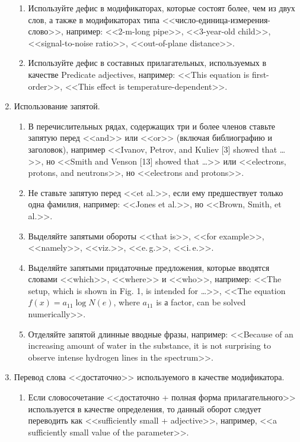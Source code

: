 \documentclass[a5paper, 10pt, twoside, numbers=enddot]{scrartcl}
\begin{document}
\begin{enumerate}
\begin{enumerate}
      \item Используйте дефис в модификаторах, которые состоят более, чем из двух слов, а также в
        модификаторах типа <<число-единица-измерения-слово>>, например: <<2-m-long pipe>>,
        <<3-year-old child>>, <<signal-to-noise ratio>>, <<out-of-plane distance>>.

      \item Используйте дефис в составных прилагательных, используемых в качестве Predicate
        adjectives, например: <<This equation is first-order>>, <<This effect is
        temperature-dependent>>.
    \end{enumerate}

  \item Использование запятой.
    \begin{enumerate}
      \item В перечислительных рядах, содержащих три и более членов ставьте запятую перед <<and>>
        или <<or>> (включая библиографию и заголовок), например <<Ivanov, Petrov, and Kuliev [3]
        showed that \ldots>>, но  <<Smith and Venson [13] showed that \ldots>> или <<electrons,
        protons, and neutrons>>, но <<electrons and protons>>.

      \item Не ставьте запятую перед <<et al.>>, если ему предшествует только одна фамилия,
        например: <<Jones et al.>>, но <<Brown, Smith, et al.>>.

      \item Выделяйте запятыми обороты <<that is>>, <<for example>>, <<namely>>, <<viz.>>,
        <<e.\,g.>>, <<i.\,e.>>.

      \item Выделяйте запятыми придаточные предложения, которые вводятся  словами <<which>>,
        <<where>> и <<who>>, например: <<The setup, which is shown in Fig. 1, is intended for
        \ldots>>, <<The equation $f(x) = a_{11}\log N(e)$, where $a_{11}$ is а factor, can be solved
        numerically>>.

      \item Отделяйте запятой длинные вводные фразы, например: <<Because of an increasing amount of
        water in the substance, it is not surprising to observe intense hydrogen lines in the
        spectrum>>.
    \end{enumerate}

  \item Перевод слова <<достаточно>> используемого в качестве модификатора.
    \begin{enumerate}
      \item Если словосочетание <<достаточно + полная форма прилагательного>> используется в
        качестве определения, то данный оборот следует переводить как <<sufficiently small +
        adjective>>, например, <<a sufficiently small value of the parameter>>.


\end{enumerate}
\end{enumerate}
\end{document}
